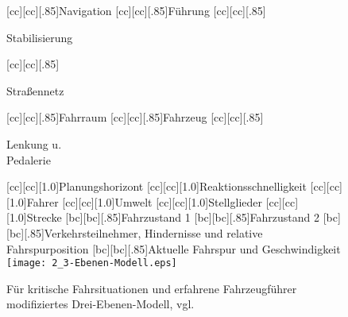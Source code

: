 %
%
\begin{figure}[h]
	\newcommand{\smallsize}{.85}
	[cc][cc][\smallsize]{Navigation}
	[cc][cc][\smallsize]{Führung}
	[cc][cc][\smallsize]{\parbox[c]{7cm}{\begin{center}Stabilisierung \end{center}}}
	[cc][cc][\smallsize]{\parbox[c]{7cm}{\begin{center}Straßennetz \end{center}}}
	[cc][cc][\smallsize]{Fahrraum}
	[cc][cc][\smallsize]{Fahrzeug}
	[cc][cc][\smallsize]{\parbox[c]{7cm}{\begin{center}Lenkung u. \\ Pedalerie \end{center}}}
	[cc][cc][1.0]{Planungshorizont}
	[cc][cc][1.0]{Reaktionsschnelligkeit}
	[cc][cc][1.0]{Fahrer}
	[cc][cc][1.0]{Umwelt}
	[cc][cc][1.0]{Stellglieder}
	[cc][cc][1.0]{Strecke}
	[bc][bc][\smallsize]{Fahrzustand 1}
	[bc][bc][\smallsize]{Fahrzustand 2}
	[bc][bc][\smallsize]{Verkehrsteilnehmer, Hindernisse und relative Fahrspurposition}
	[bc][bc][\smallsize]{Aktuelle Fahrspur und Geschwindigkeit}
	\centering
	\texttt{[image: 2\_3-Ebenen-Modell.eps]}
	\caption[Modifiziertes Drei-Ebenen-Modell]{Für kritische Fahrsituationen und erfahrene Fahrzeugführer modifiziertes Drei-Ebenen-Modell, vgl.\ \cite{donges1996regelsysteme}}%
	\label{fig:dreiebenenmodell}
\end{figure}


